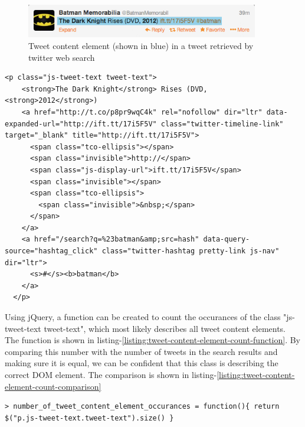   \begin{figure}[H]
\includegraphics[width=4in]{image/tweet-text-and-url-field.png}
\centering
\caption{Tweet content element (shown in blue) in a tweet retrieved by twitter web search}
\label{figure:tweet-text-field}
\end{figure}

\begin{lstlisting}[caption={HTML of the tweet content element in a tweet},label={listing:tweet-content-element-html},captionpos=b]
  <p class="js-tweet-text tweet-text">
    <strong>The Dark Knight</strong> Rises (DVD, <strong>2012</strong>)
    <a href="http://t.co/p8pr9wqC4k" rel="nofollow" dir="ltr" data-expanded-url="http://ift.tt/17i5F5V" class="twitter-timeline-link" target="_blank" title="http://ift.tt/17i5F5V">
      <span class="tco-ellipsis"></span>
      <span class="invisible">http://</span>
      <span class="js-display-url">ift.tt/17i5F5V</span>
      <span class="invisible"></span>
      <span class="tco-ellipsis">
        <span class="invisible">&nbsp;</span>
      </span>
    </a>
    <a href="/search?q=%23batman&amp;src=hash" data-query-source="hashtag_click" class="twitter-hashtag pretty-link js-nav" dir="ltr">
      <s>#</s><b>batman</b>
    </a>
  </p>
\end{lstlisting}

\noindent
Using jQuery, a function can be created to count the occurances of the class "js-tweet-text tweet-text", which most likely describes all tweet content elements. The function is shown in listing-\ref{listing:tweet-content-element-count-function}. By comparing this number with the number of tweets in the search results and making sure it is equal, we can be confident that this class is describing the correct DOM element. The comparison is shown in 
listing-\ref{listing:tweet-content-element-count-comparison}

\begin{lstlisting}[caption={Creating a function in GCDT Javascript Console for counting the occurance of tweet content elements on the twitter search result page},label={listing:tweet-content-element-count-function},captionpos=b]
  > number_of_tweet_content_element_occurances = function(){ return $("p.js-tweet-text.tweet-text").size() }
\end{lstlisting}


